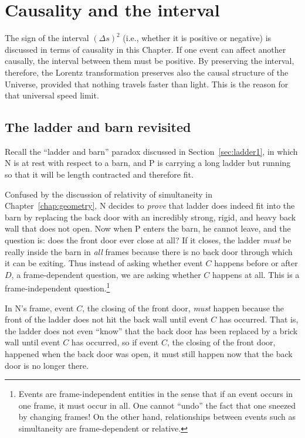 \chapter{Causality and the interval}
\label{chap:causality}

The sign of the interval $(\Delta s)^2$ (i.e., whether it is positive
or negative) is discussed in terms of causality in this Chapter.  If
one event can affect another causally, the interval between them must
be positive.  By preserving the interval, therefore, the Lorentz
transformation preserves also the causal structure of the Universe,
provided that nothing travels faster than light.  This is the reason
for that universal speed limit.


\section{The ladder and barn revisited}
\label{sec:ladder2}

Recall the ``ladder and barn'' paradox discussed in
Section~\ref{sec:ladder1}, in which N is at rest with respect to a
barn, and P is carrying a long ladder but running so that it will be
length contracted and therefore fit.

Confused by the discussion of relativity of simultaneity in
Chapter~\ref{chap:geometry}, N decides to {\em prove\/} that ladder
does indeed fit into the barn by replacing the back door with an
incredibly strong, rigid, and heavy back wall that does not open.  Now
when P enters the barn, he cannot leave, and the question is: does the
front door ever close at all?  If it closes, the ladder {\em must\/}
be really inside the barn in {\em all\/} frames because there is no
back door through which it can be exiting.  Thus instead of asking
whether event $C$ happens before or after $D$, a frame-dependent
question, we are asking whether $C$ happens at all.  This is a
frame-independent question.\footnote{Events are frame-independent
entities in the sense that if an event occurs in one frame, it must
occur in all.  One cannot ``undo'' the fact that one sneezed by
changing frames!  On the other hand, relationships between events such
as simultaneity are frame-dependent or relative.}

In N's frame, event $C$, the closing of the front door, {\em must\/}
happen because the front of the ladder does not hit the back wall
until event $C$ has occurred.  That is, the ladder does not even
``know'' that the back door has been replaced by a brick wall until
event $C$ has occurred, so if event $C$, the closing of the front
door, happened when the back door was open, it must still happen now
that the back door is no longer there.

